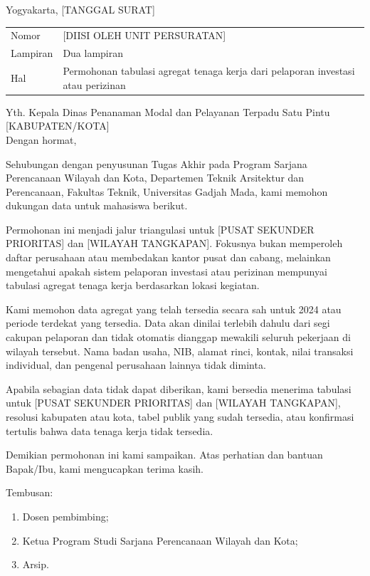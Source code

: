 \documentclass[12pt]{article}
\newcommand{\KabupatenKota}{[KABUPATEN/KOTA]}
\newcommand{\AlamatInstansi}{[ALAMAT INSTANSI]}
\newcommand{\PusatSekunder}{[PUSAT SEKUNDER PRIORITAS]}
\newcommand{\WilayahTangkapan}{[WILAYAH TANGKAPAN]}
\newcommand{\PeriodeData}{2024 atau periode terdekat yang tersedia}
\begin{document}
\KopSurat

\begin{flushright}
Yogyakarta, [TANGGAL SURAT]
\end{flushright}

\begin{tabularx}{\textwidth}{@{}P{0.20\textwidth}Y@{}}
  Nomor & [DIISI OLEH UNIT PERSURATAN] \\
  Lampiran & Dua lampiran \\
  Hal & Permohonan tabulasi agregat tenaga kerja dari pelaporan investasi atau perizinan
\end{tabularx}

Yth. Kepala Dinas Penanaman Modal dan Pelayanan Terpadu Satu Pintu \KabupatenKota\\
\AlamatInstansi

Dengan hormat,

Sehubungan dengan penyusunan Tugas Akhir pada Program Sarjana Perencanaan Wilayah dan Kota, Departemen Teknik Arsitektur dan Perencanaan, Fakultas Teknik, Universitas Gadjah Mada, kami memohon dukungan data untuk mahasiswa berikut.

\IdentitasMahasiswa

Permohonan ini menjadi jalur triangulasi untuk \PusatSekunder{} dan \WilayahTangkapan{}. Fokusnya bukan memperoleh daftar perusahaan atau membedakan kantor pusat dan cabang, melainkan mengetahui apakah sistem pelaporan investasi atau perizinan mempunyai tabulasi agregat tenaga kerja berdasarkan lokasi kegiatan.

Kami memohon data agregat yang telah tersedia secara sah untuk \PeriodeData. Data akan dinilai terlebih dahulu dari segi cakupan pelaporan dan tidak otomatis dianggap mewakili seluruh pekerjaan di wilayah tersebut. Nama badan usaha, NIB, alamat rinci, kontak, nilai transaksi individual, dan pengenal perusahaan lainnya tidak diminta.

\PernyataanPenggunaanData

\PernyataanTanpaBiaya

Apabila sebagian data tidak dapat diberikan, kami bersedia menerima tabulasi untuk \PusatSekunder{} dan \WilayahTangkapan{}, resolusi kabupaten atau kota, tabel publik yang sudah tersedia, atau konfirmasi tertulis bahwa data tenaga kerja tidak tersedia.

Demikian permohonan ini kami sampaikan. Atas perhatian dan bantuan Bapak/Ibu, kami mengucapkan terima kasih.

\vspace{8pt}
Tembusan:
\begin{enumerate}
  \item Dosen pembimbing;
  \item Ketua Program Studi Sarjana Perencanaan Wilayah dan Kota;
  \item Arsip.
\end{enumerate}
\end{document}
